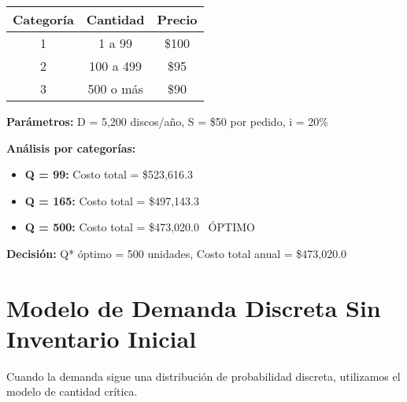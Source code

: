 \documentclass[12pt,a4paper]{book}
\begin{document}
	\begin{tcolorbox}[enhanced,colback=grisclaro,colframe=grisoScuro,boxrule=2pt,arc=8pt,
		title={\bfseries\color{white} \faTable\ ESTRUCTURA DE DESCUENTOS}]
		
		\begin{center}
			\begin{tabular}{|c|c|c|}
				\hline
				\rowcolor{azulclaro}
				\textbf{Categoría} & \textbf{Cantidad} & \textbf{Precio} \\
				\hline
				1 & 1 a 99 & \textcolor{rojoacento}{\$100} \\
				\hline
				2 & 100 a 499 & \textcolor{naranjaacento}{\$95} \\
				\hline
				3 & 500 o más & \textcolor{verdeprincipal}{\$90} \\
				\hline
			\end{tabular}
		\end{center}
		
		\textbf{Parámetros:} D = 5,200 discos/año, S = \$50 por pedido, i = 20\%
		
		\textbf{Análisis por categorías:}
		\begin{itemize}[leftmargin=*,label=\textcolor{azulprincipal}{\faArrowRight}]
			\item \textbf{Q = 99:} Costo total = \textcolor{rojoacento}{\$523,616.3}
			\item \textbf{Q = 165:} Costo total = \textcolor{naranjaacento}{\$497,143.3}
			\item \textbf{Q = 500:} Costo total = \textcolor{verdeprincipal}{\$473,020.0} \faCheckCircle\ ÓPTIMO
		\end{itemize}
		
		\textbf{Decisión:} Q* óptimo = 500 unidades, Costo total anual = \$473,020.0
		
	\end{tcolorbox}
	
	\section{Modelo de Demanda Discreta Sin Inventario Inicial}
	
	\begin{tcolorbox}[enhanced,colback=naranjaclaro,colframe=naranjaacento,boxrule=3pt,arc=12pt,
		drop shadow,title={\Large\bfseries\color{white} \faChartLine\ MODELO DE DEMANDA DISCRETA}]
		
		Cuando la demanda sigue una distribución de probabilidad discreta, utilizamos el modelo de cantidad crítica.
		
	\end{tcolorbox}
	
\end{document}
